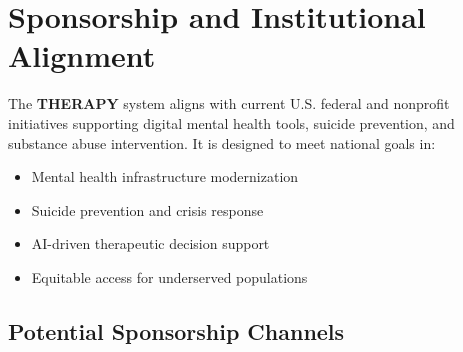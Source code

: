 \section{Sponsorship and Institutional Alignment}

The \textbf{THERAPY} system aligns with current U.S. federal and nonprofit initiatives supporting digital mental health tools, suicide prevention, and substance abuse intervention. It is designed to meet national goals in:

\begin{itemize}
  \item Mental health infrastructure modernization
  \item Suicide prevention and crisis response
  \item AI-driven therapeutic decision support
  \item Equitable access for underserved populations
\end{itemize}

\subsection*{Potential Sponsorship Channels}

